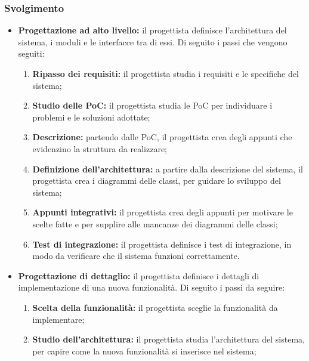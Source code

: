 \subsubsection{Svolgimento}
\begin{itemize}
	\item \textbf{Progettazione ad alto livello:} il progettista definisce
	      l'architettura del sistema, i moduli e le interfacce tra di essi. Di
	      seguito i passi che vengono seguiti:
	      \begin{enumerate}
		      \item \textbf{Ripasso dei requisiti:} il progettista studia i
		            requisiti e le specifiche del sistema;

		      \item \textbf{Studio delle PoC:} il progettista studia le PoC per
		            individuare i problemi e le soluzioni adottate;

		      \item \textbf{Descrizione:} partendo dalle PoC, il progettista
		            crea degli appunti che evidenzino la struttura da
		            realizzare;

		      \item \textbf{Definizione dell'architettura:} a partire dalla
		            descrizione del sistema, il progettista crea i diagrammi
		            delle classi, per guidare lo sviluppo del sistema;

		      \item \textbf{Appunti integrativi:} il progettista
		            crea degli appunti per motivare le scelte fatte e per
		            supplire alle mancanze dei diagrammi delle classi;

		      \item \textbf{Test di integrazione:} il progettista definisce i
		            test di integrazione, in modo da verificare che il sistema
		            funzioni correttamente.
	      \end{enumerate}

	\item \textbf{Progettazione di dettaglio:} il progettista definisce i
	      dettagli di implementazione di una nuova funzionalità. Di seguito i
	      passi da seguire:
	      \begin{enumerate}
		      \item \textbf{Scelta della funzionalità:} il progettista
		            sceglie la funzionalità da implementare;

		      \item \textbf{Studio dell'architettura:} il progettista
		            studia l'architettura del sistema, per capire come
		            la nuova funzionalità si inserisce nel sistema;


\end{enumerate}
\end{itemize}

